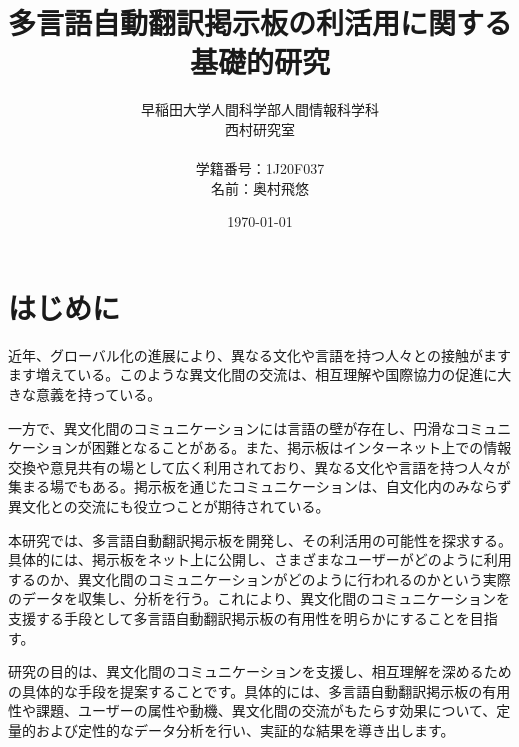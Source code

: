\documentclass[b5paper,12pt]{jsreport}
\title{多言語自動翻訳掲示板の利活用に関する基礎的研究}
\author{早稲田大学人間科学部人間情報科学科\\
西村研究室\\
\\
学籍番号：1J20F037\\
名前：奥村飛悠}
\date{\today}
\begin{document}
\maketitle
\tableofcontents

\chapter{はじめに}



近年、グローバル化の進展により、異なる文化や言語を持つ人々との接触がますます増えている。このような異文化間の交流は、相互理解や国際協力の促進に大きな意義を持っている。

一方で、異文化間のコミュニケーションには言語の壁が存在し、円滑なコミュニケーションが困難となることがある。また、掲示板はインターネット上での情報交換や意見共有の場として広く利用されており、異なる文化や言語を持つ人々が集まる場でもある。掲示板を通じたコミュニケーションは、自文化内のみならず異文化との交流にも役立つことが期待されている。

本研究では、多言語自動翻訳掲示板を開発し、その利活用の可能性を探求する。具体的には、掲示板をネット上に公開し、さまざまなユーザーがどのように利用するのか、異文化間のコミュニケーションがどのように行われるのかという実際のデータを収集し、分析を行う。これにより、異文化間のコミュニケーションを支援する手段として多言語自動翻訳掲示板の有用性を明らかにすることを目指す。

研究の目的は、異文化間のコミュニケーションを支援し、相互理解を深めるための具体的な手段を提案することです。具体的には、多言語自動翻訳掲示板の有用性や課題、ユーザーの属性や動機、異文化間の交流がもたらす効果について、定量的および定性的なデータ分析を行い、実証的な結果を導き出します。

\end{document}
